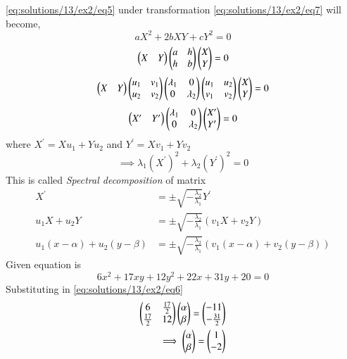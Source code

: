 \eqref{eq:solutions/13/ex2/eq5} under transformation \eqref{eq:solutions/13/ex2/eq7} will become,
\begin{equation}\label{eq:solutions/13/ex2/eq8}
	aX^2 + 2bXY + cY^2 = 0
\end{equation}
\begin{equation}\label{eq:solutions/13/ex2/eq9}
	\begin{pmatrix}X & Y\end{pmatrix} \begin{pmatrix}a & h \\ h & b\end{pmatrix} \begin{pmatrix}X \\ Y\end{pmatrix} = 0
\end{equation}
\begin{equation}\label{eq:solutions/13/ex2/eq11}
	\begin{pmatrix}X & Y\end{pmatrix} \begin{pmatrix}u_1 & v_1 \\ u_2 & v_2\end{pmatrix} \begin{pmatrix}\lambda_1 & 0\\ 0 & \lambda_2\end{pmatrix} \begin{pmatrix}u_1 & u_2 \\ v_1 & v_2\end{pmatrix} \begin{pmatrix}X \\ Y\end{pmatrix} = 0
\end{equation}
\begin{equation}\label{eq:solutions/13/ex2/eq12}
	\begin{pmatrix}X^\prime & Y^\prime\end{pmatrix}  \begin{pmatrix}\lambda_1 & 0\\ 0 & \lambda_2\end{pmatrix} \begin{pmatrix}X^\prime \\ Y^\prime\end{pmatrix} = 0
\end{equation}
where $X^\prime = Xu_1 + Yu_2$ and $Y^\prime = Xv_1 + Yv_2$
\begin{equation}\label{eq:solutions/13/ex2/eq13}
	\implies \lambda_1 (X^\prime)^2 + \lambda_2 (Y^\prime)^2 = 0
\end{equation}
This is called \textit{Spectral decomposition} of matrix
\begin{align}
	X^\prime &= \pm \sqrt{-\frac{\lambda_2}{\lambda_1}}Y^\prime\\
	u_1X + u_2Y &= \pm \sqrt{-\frac{\lambda_2}{\lambda_1}}(v_1X + v_2Y)\\
	\label{eq:solutions/13/ex2/eq14}u_1(x-\alpha) + u_2(y-\beta) &= \pm \sqrt{-\frac{\lambda_2}{\lambda_1}}(v_1(x-\alpha) + v_2(y-\beta))
\end{align}
Given equation is
\begin{equation}\label{eq:solutions/13/ex2/eq15}
	6x^2 + 17xy + 12y^2 + 22x + 31y + 20 = 0
\end{equation}
Substituting in \eqref{eq:solutions/13/ex2/eq6}
\begin{align}
	\label{eq:solutions/13/ex2/eq16}\begin{pmatrix} 6 & \frac{17}{2}\\\frac{17}{2} & 12\end{pmatrix}\begin{pmatrix}\alpha \\ \beta\end{pmatrix} = \begin{pmatrix}-11 \\ -\frac{31}{2}\end{pmatrix} \\
	\label{eq:solutions/13/ex2/eq17}\implies \begin{pmatrix}\alpha \\ \beta\end{pmatrix} = \begin{pmatrix}1 \\ -2\end{pmatrix}
\end{align}

